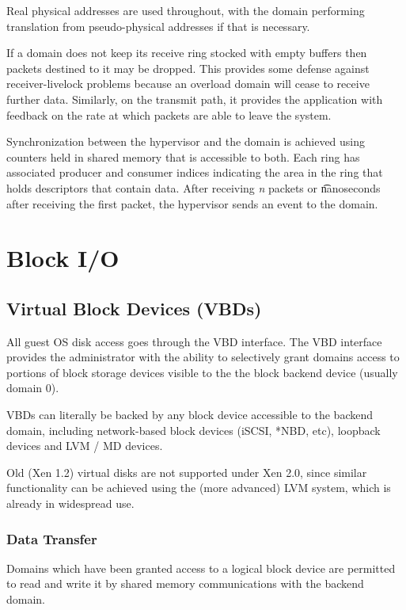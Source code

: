 \documentclass[11pt,twoside,final,openright]{xenstyle}
\begin{document}
Real physical addresses are used throughout, with the domain performing 
translation from pseudo-physical addresses if that is necessary.

If a domain does not keep its receive ring stocked with empty buffers then 
packets destined to it may be dropped.  This provides some defense against 
receiver-livelock problems because an overload domain will cease to receive
further data.  Similarly, on the transmit path, it provides the application
with feedback on the rate at which packets are able to leave the system.

Synchronization between the hypervisor and the domain is achieved using 
counters held in shared memory that is accessible to both.  Each ring has
associated producer and consumer indices indicating the area in the ring
that holds descriptors that contain data.  After receiving {\it n} packets
or {\t nanoseconds} after receiving the first packet, the hypervisor sends
an event to the domain. 

\chapter{Block I/O}

\section{Virtual Block Devices (VBDs)}

All guest OS disk access goes through the VBD interface.  The VBD
interface provides the administrator with the ability to selectively
grant domains access to portions of block storage devices visible to
the the block backend device (usually domain 0).

VBDs can literally be backed by any block device accessible to the
backend domain, including network-based block devices (iSCSI, *NBD,
etc), loopback devices and LVM / MD devices.

Old (Xen 1.2) virtual disks are not supported under Xen 2.0, since
similar functionality can be achieved using the (more advanced) LVM
system, which is already in widespread use.

\subsection{Data Transfer}
Domains which have been granted access to a logical block device are permitted
to read and write it by shared memory communications with the backend domain. 
\end{document}
